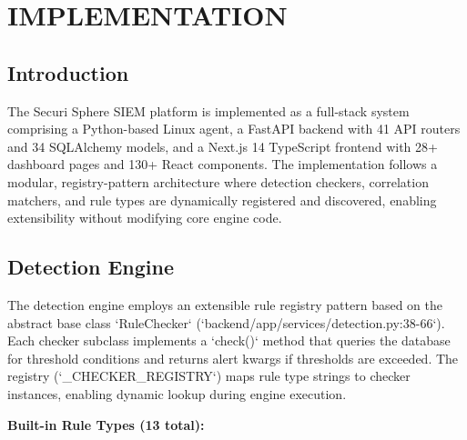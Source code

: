 \chapter{IMPLEMENTATION}

\section{Introduction}

The Securi Sphere SIEM platform is implemented as a full-stack system comprising a Python-based Linux agent, a FastAPI backend with 41 API routers and 34 SQLAlchemy models, and a Next.js 14 TypeScript frontend with 28+ dashboard pages and 130+ React components. The implementation follows a modular, registry-pattern architecture where detection checkers, correlation matchers, and rule types are dynamically registered and discovered, enabling extensibility without modifying core engine code.

\section{Detection Engine}

The detection engine employs an extensible rule registry pattern based on the abstract base class `RuleChecker` (`backend/app/services/detection.py:38-66`). Each checker subclass implements a `check()` method that queries the database for threshold conditions and returns alert kwargs if thresholds are exceeded. The registry (`_CHECKER_REGISTRY`) maps rule type strings to checker instances, enabling dynamic lookup during engine execution.

\noindent\textbf{Built-in Rule Types (13 total):}

